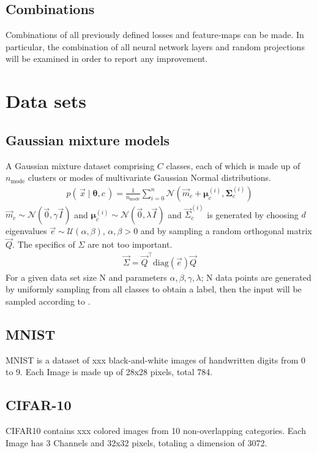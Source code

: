 \subsection{Combinations}
Combinations of all previously defined losses and feature-maps can be made. In particular, the combination of all neural network layers and random projections will be examined in order to report any improvement.


\section{Data sets}
\subsection{Gaussian mixture models}
A Gaussian mixture dataset comprising $C$ classes, each of which is made up of $n_\text{mode}$ clusters or modes of multivariate Gaussian Normal distributions.
\begin{align}
\label{eqn:gmmdistr}
    p(\, \vec x \mid \boldsymbol \theta, c \,) = \frac 1 {n_\text{mode}} \sum _{i=0}^n
    \mathcal N (\vec m_c + \boldsymbol \mu_c^{(i)}, \boldsymbol \Sigma_c^{(i)})
\end{align}
$\vec m_c \sim \mathcal N (\vec 0, \gamma \vec I)$ and
$\boldsymbol \mu_c^{(i)} \sim \mathcal N (\vec 0, \lambda \vec I)$ and
$\vec \Sigma_c^{(i)}$ is generated by choosing $d$ eigenvalues $\vec e \sim \mathcal U(\alpha, \beta)$, $\alpha, \beta > 0$ and 
by sampling a random orthogonal matrix $\vec Q$. The specifics of $\Sigma$ are not too important.
\begin{align*}
    \vec \Sigma = \vec Q^\top \text{diag}(\vec e) \vec Q
\end{align*}
For a given data set size N and parameters $\alpha, \beta, \gamma, \lambda$; N data points are generated by uniformly sampling from all classes to obtain a label, then the input will be sampled according to .

\subsection{MNIST}
MNIST is a dataset of xxx black-and-white images of handwritten digits from 0 to 9. 
Each Image is made up of 28x28 pixels, total 784.

\subsection{CIFAR-10}
CIFAR10 contains xxx colored images from 10 non-overlapping categories.
Each Image has 3 Channels and 32x32 pixels, totaling a dimension of 3072.



